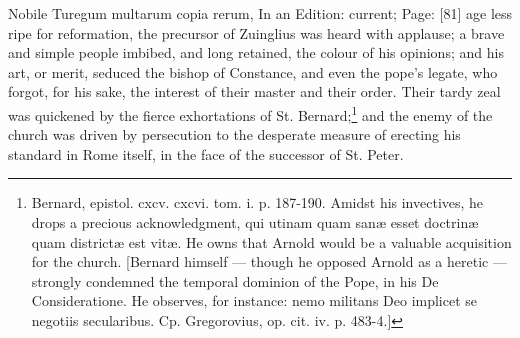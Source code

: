 {Nobile Turegum multarum copia rerum,} In an Edition: current; Page: [81] age less ripe for reformation, the precursor of Zuinglius was heard with applause; a brave and simple people imbibed, and long retained, the colour of his opinions; and his art, or merit, seduced the bishop of Constance, and even the pope\texthebrew{}’s legate, who forgot, for his sake, the interest of their master and their order. Their tardy zeal was quickened by the fierce exhortations of St. Bernard;\footnote{Bernard, epistol. cxcv. cxcvi. tom. i. p. 187-190. Amidst his invectives, he drops a precious acknowledgment, qui utinam quam sanæ esset doctrinæ quam districtæ est vitæ. He owns that Arnold would be a valuable acquisition for the church. [Bernard himself \texthebrew{—} though he opposed Arnold as a heretic \texthebrew{—} strongly condemned the temporal dominion of the Pope, in his De Consideratione. He observes, for instance: nemo militans Deo implicet se negotiis secularibus. Cp. Gregorovius, op. cit. iv. p. 483-4.]} and the enemy of the church was driven by persecution to the desperate measure of erecting his standard in Rome itself, in the face of the successor of St. Peter.

